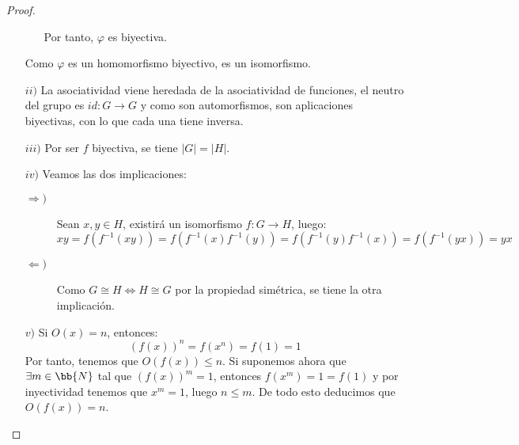 \begin{prop}
\begin{proof}
\begin{enumerate}
\begin{itemize}
                        Por tanto, $\varphi$ es biyectiva.
                \end{itemize}
                Como $\varphi$ es un homomorfismo biyectivo, es un isomorfismo.
            \item[$ii)$] La asociatividad viene heredada de la asociatividad de funciones, el neutro del grupo es $id:G\to G$ y como son automorfismos, son aplicaciones biyectivas, con lo que cada una tiene inversa.
            \item[$iii)$] Por ser $f$ biyectiva, se tiene $|G| = |H|$.
            \item[$iv)$] Veamos las dos implicaciones:
                \begin{description}
                    \item [$\Longrightarrow)$] Sean $x,y\in H$, existirá un isomorfismo $f:G\to H$, luego:
                        \begin{equation*}
                            xy = f(f^{-1}(xy)) = f(f^{-1}(x)f^{-1}(y)) = f(f^{-1}(y) f^{-1}(x)) = f(f^{-1}(yx)) = yx
                        \end{equation*}
                    \item [$\Longleftarrow)$] Como $G\cong H \Longleftrightarrow H\cong G$ por la propiedad simétrica, se tiene la otra implicación.
                \end{description}
            \item[$v)$] Si $O(x) = n$, entonces:
                \begin{equation*}
                    {(f(x))}^{n} = f(x^n) = f(1) = 1
                \end{equation*}
                Por tanto, tenemos que $O(f(x))\leq n$.
                Si suponemos ahora que $\exists m\in \bb{N}$ tal que ${(f(x))}^{m}=1$, entonces $f(x^m)= 1 = f(1)$ y por inyectividad tenemos que $x^m = 1$, luego $n\leq m$. De todo esto deducimos que $O(f(x)) = n$.


\end{enumerate}
\end{proof}
\end{prop}
